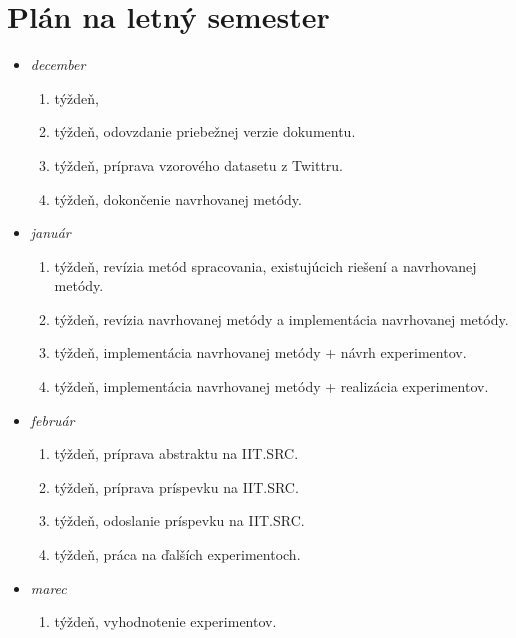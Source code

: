 %

\chapter{Plán na letný semester}
\begin{itemize}
    \item \textit{december}
        \begin{enumerate}
            \item týždeň,
            \item týždeň, odovzdanie priebežnej verzie dokumentu.
            \item týždeň, príprava vzorového datasetu z Twittru.
            \item týždeň, dokončenie navrhovanej metódy.
        \end{enumerate}
    \item \textit{január}
        \begin{enumerate}
            \item týždeň, revízia metód spracovania, existujúcich riešení a navrhovanej metódy.
            \item týždeň, revízia navrhovanej metódy a implementácia navrhovanej metódy.
            \item týždeň, implementácia navrhovanej metódy + návrh experimentov. 
            \item týždeň,  implementácia navrhovanej metódy + realizácia experimentov.
        \end{enumerate}
    \item \textit{február}
        \begin{enumerate}
            \item týždeň, príprava abstraktu na IIT.SRC.
            \item týždeň, príprava príspevku na IIT.SRC.
            \item týždeň, odoslanie príspevku na IIT.SRC.
            \item týždeň, práca na ďalších experimentoch.
        \end{enumerate}
    \item \textit{marec}
        \begin{enumerate}
            \item týždeň, vyhodnotenie experimentov.

\end{enumerate}
\end{itemize}
